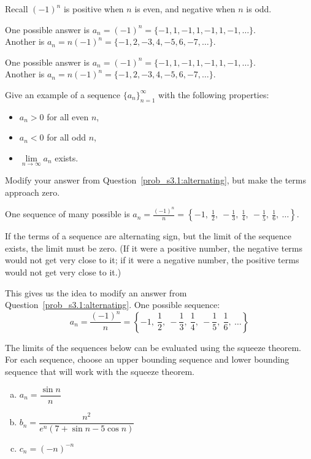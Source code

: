 \begin{hint}
Recall $(-1)^n$ is positive when $n$ is even, and negative when $n$ is odd.
\end{hint}
\begin{answer}
One possible answer is $a_n=(-1)^{n} = \{-1, 1,-1,1,-1,1,-1,\ldots\}$. \\Another is
$a_n=n(-1)^{n} = \{-1, 2,-3,4,-5,6,-7,\ldots\}$.
\end{answer}
\begin{solution}
One possible answer is $a_n=(-1)^{n} = \{-1, 1,-1,1,-1,1,-1,\ldots\}$. \\Another is
$a_n=n(-1)^{n} = \{-1, 2,-3,4,-5,6,-7,\ldots\}$.
\end{solution}
\begin{Mquestion}
Give an example of a sequence $\{a_n\}_{n=1}^{\infty}$ with the following properties:
\begin{itemize}
\item $a_n>0$ for all even $n$,
\item $a_n<0$ for all odd $n$,
\item $\lim\limits_{n \to \infty} a_n$ exists.
\end{itemize}
\end{Mquestion}
\begin{hint}
Modify your answer from Question~\ref{prob_s3.1:alternating}, but make the terms approach zero.
\end{hint}
\begin{answer}
One  sequence of many possible is
$\displaystyle a_n = \frac{(-1)^n}{n} = \left\{-1,\ \frac12,\ -\frac13,\ \frac14,\ -\frac15,\ \frac16,\ \ldots \right\}$.
\end{answer}
\begin{solution}
If the terms of a sequence are alternating sign, but the limit of the sequence exists, the limit must be zero. (If it were a positive number, the negative terms would not get very close to it; if it were a negative number, the positive terms would not get very close to it.)

This gives us the idea to modify an answer from Question~\ref{prob_s3.1:alternating}. One possible sequence:
\[a_n = \frac{(-1)^n}{n} = \left\{-1,\ \frac12,\ -\frac13,\ \frac14,\ -\frac15,\ \frac16,\ \ldots \right\}\]
\end{solution}
\begin{Mquestion}
The limits of the sequences below can be evaluated using the squeeze theorem. For each sequence, choose an upper bounding sequence and lower bounding sequence that will work with the squeeze theorem.
\begin{enumerate}[(a)]
\item $a_n = \dfrac{\sin n}{n}$
\item $b_n = \dfrac{n^2}{e^n(7+\sin n - 5\cos n)}$
\item $c_n = (-n)^{-n}$
\end{enumerate}
\end{Mquestion}

